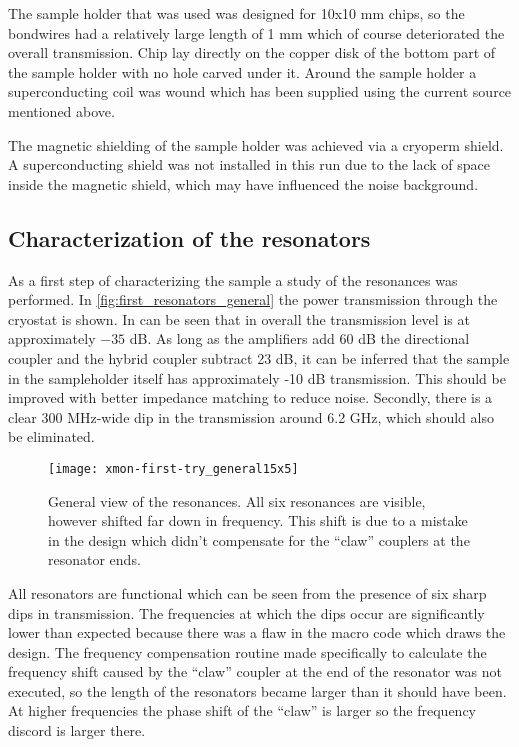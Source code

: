 \documentclass[12pt, twoside]{report}
\numberwithin{equation}{section}
\begin{document}
The sample holder that was used was designed for 10x10 mm chips, so the bondwires had a relatively large length of 1 mm which of course deteriorated the overall transmission. Chip lay directly on the copper disk of the bottom part of the sample holder with no hole carved under it. Around the sample holder a superconducting coil was wound which has been supplied using the current source mentioned above.

The magnetic shielding of the sample holder was achieved via a cryoperm shield. A superconducting shield was not installed in this run due to the lack of space inside the magnetic shield, which may have influenced the noise background.


\subsection{Characterization of the resonators}

As a first step of characterizing the sample a study of the resonances was performed. In \autoref{fig:first_resonators_general} the power transmission through the cryostat is shown. In can be seen that in overall the transmission level is at approximately $-35$ dB. As long as the amplifiers add 60 dB the directional coupler and the hybrid coupler subtract 23 dB, it can be inferred that the sample in the sampleholder itself has approximately -10 dB transmission. This should be improved with better impedance matching to reduce noise. Secondly, there is a clear 300 MHz-wide dip in the transmission around 6.2 GHz, which should also be eliminated.

\begin{figure}[h]
\centering
\texttt{[image: xmon-first-try\_general15x5]}
\caption{General view of the resonances. All six resonances are visible, however shifted far down in frequency. This shift is due to a mistake in the design which didn't compensate for the ``claw'' couplers at the resonator ends.}
\label{fig:first_resonators_general}
\end{figure}

All resonators are functional which can be seen from the presence of six sharp dips in transmission. The frequencies at which the dips occur are significantly lower than expected because there was a flaw in the macro code which draws the design. The frequency compensation routine made specifically to calculate the frequency shift\cite{Sank2014} caused by the ``claw'' coupler at the end of the resonator was not executed, so the length of the resonators became larger than it should have been. At higher frequencies the phase shift of the ``claw'' is larger so the frequency discord is larger there.
\end{document}
